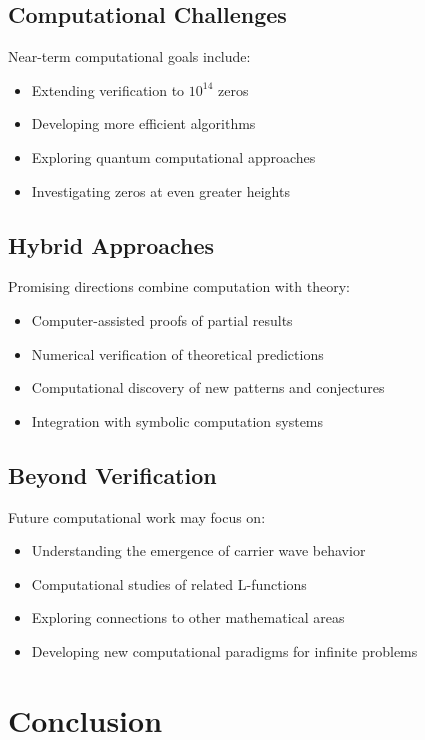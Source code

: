 \subsection{Computational Challenges}

Near-term computational goals include:
\begin{itemize}
\item Extending verification to $10^{14}$ zeros
\item Developing more efficient algorithms
\item Exploring quantum computational approaches
\item Investigating zeros at even greater heights
\end{itemize}

\subsection{Hybrid Approaches}

Promising directions combine computation with theory:
\begin{itemize}
\item Computer-assisted proofs of partial results
\item Numerical verification of theoretical predictions
\item Computational discovery of new patterns and conjectures
\item Integration with symbolic computation systems
\end{itemize}

\subsection{Beyond Verification}

Future computational work may focus on:
\begin{itemize}
\item Understanding the emergence of carrier wave behavior
\item Computational studies of related L-functions
\item Exploring connections to other mathematical areas
\item Developing new computational paradigms for infinite problems
\end{itemize}

\section{Conclusion}

